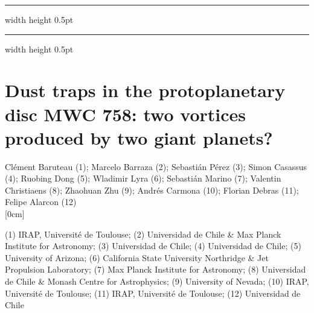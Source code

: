\documentclass[a4paper,11pt]{book}
\def\doubleline{
\hrule width \hsize height 0.5pt  \kern 1mm \hrule width \hsize height 0.5pt 
}
\begin{document}
\noindent\doubleline
        
          \section[Dust traps in the protoplanetary disc MWC 758: two vortices produced by two giant planets? \newline(Clément Baruteau)] { Dust traps in the protoplanetary disc MWC 758: two vortices produced by two giant planets? }



\begin{center}
{\large Clément Baruteau (1)};{ \large  Marcelo Barraza (2)};{ \large  Sebastián Pérez (3)};{ \large  Simon Casassus (4)};{ \large  Ruobing Dong (5)};{ \large  Wladimir Lyra (6)};{ \large  Sebastián Marino (7)};{ \large  Valentin Christiaens (8)};{ \large  Zhaohuan Zhu (9)};{ \large  Andrés Carmona (10)};{ \large  Florian Debras (11)};{ \large  Felipe Alarcon (12)}\\



[0cm]



           
  
\vspace{2 mm}
\noindent (1) IRAP, Université de Toulouse; (2)  Universidad de Chile \& Max Planck Institute for Astronomy; (3)  Universidad de Chile; (4)  Universidad de Chile; (5)  University of Arizona; (6)  California State University Northridge \& Jet Propulsion Laboratory; (7)  Max Planck Institute for Astronomy; (8)  Universidad de Chile \& Monash Centre for Astrophysics; (9)  University of Nevada; (10)  IRAP, Université de Toulouse; (11)  IRAP, Université de Toulouse; (12)  Universidad de Chile\\

\end{center}
\end{document}
